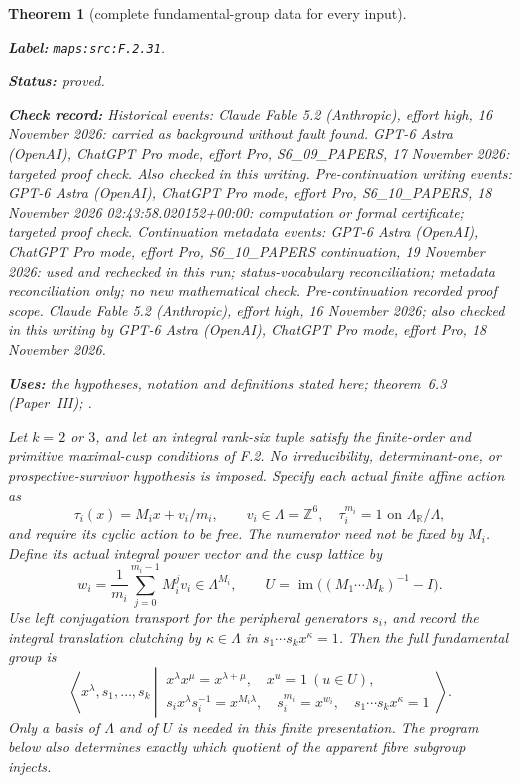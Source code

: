\documentclass[11pt,a4paper]{article}
\newtheorem{theorem}{Theorem}[section]
\theoremstyle{definition}
\newcommand{\StatementRecord}[4]{\par\smallskip\begingroup\upshape\raggedright\noindent\textbf{Label:} \nolinkurl{#1}.\par\noindent\textbf{Status:} #2.\par\noindent\textbf{Check record:} #3.\par\noindent\textbf{Uses:} #4.\par\endgroup\smallskip}
\newcommand{\ExternalPaperRef}[3]{\ifmmode\text{\upshape #1#2 (Paper~#3)}\else #1#2 (Paper~#3)\fi}
\begin{document}
\begin{theorem}[complete fundamental-group data for every input]\label{maps:src:F.2.31}
\StatementRecord{maps:src:F.2.31}{proved}{Historical events: Claude Fable 5.2 (Anthropic), effort high, 16 November 2026: carried as background without fault found. GPT-6 Astra (OpenAI), ChatGPT Pro mode, effort Pro, S6\_09\_PAPERS, 17 November 2026: targeted proof check. Also checked in this writing. Pre-continuation writing events: GPT-6 Astra (OpenAI), ChatGPT Pro mode, effort Pro, S6\_10\_PAPERS, 18 November 2026 02:43:58.020152+00:00: computation or formal certificate; targeted proof check. Continuation metadata events: GPT-6 Astra (OpenAI), ChatGPT Pro mode, effort Pro, S6\_10\_PAPERS continuation, 19 November 2026: used and rechecked in this run; status-vocabulary reconciliation; metadata reconciliation only; no new mathematical check. \emph{Pre-continuation recorded proof scope.} Claude Fable 5.2 (Anthropic), effort high, 16 November 2026; also checked in this writing by GPT-6 Astra (OpenAI), ChatGPT Pro mode, effort Pro, 18 November 2026}{the hypotheses, notation and definitions stated here; \ExternalPaperRef{theorem~}{6.3}{III}; \cite[Theorems 2.3--2.4, p.~425; Euler-characteristic comparison, pp.~427--428]{rootScott83}}


Let $k=2$ or $3$, and let an integral rank-six tuple satisfy the
finite-order and primitive maximal-cusp conditions of F.2.  No
irreducibility, determinant-one, or prospective-survivor hypothesis is
imposed.  Specify each actual finite affine action as
\[
 \tau_i(x)=M_ix+v_i/m_i,\qquad v_i\in\Lambda=\mathbb Z^6,
 \quad \tau_i^{m_i}=1\text{ on }\Lambda_{\mathbb R}/\Lambda,
 \tag{F.G1}\label{maps:eq:F.G1}
\]
and require its cyclic action to be free.  The numerator need not be
fixed by $M_i$.  Define its actual integral power vector and the cusp
lattice by
\[
 w_i=\frac1{m_i}\sum_{j=0}^{m_i-1}M_i^jv_i\in\Lambda^{M_i},
 \qquad U=\operatorname{im}\bigl((M_1\cdots M_k)^{-1}-I\bigr).
 \tag{F.G2}\label{maps:eq:F.G2}
\]
Use left conjugation transport for the peripheral generators $s_i$,
and record the integral translation clutching by $\kappa\in\Lambda$
in $s_1\cdots s_kx^\kappa=1$.  Then the full fundamental group is
\[
 \left\langle x^\lambda,s_1,\ldots,s_k\ \left|\
 \begin{array}{l}
 x^\lambda x^\mu=x^{\lambda+\mu},\quad x^u=1\ (u\in U),\\
 s_ix^\lambda s_i^{-1}=x^{M_i\lambda},\quad
 s_i^{m_i}=x^{w_i},\quad s_1\cdots s_kx^\kappa=1
 \end{array}\right.\right\rangle .                         \tag{F.G3}\label{maps:eq:F.G3}
\]
Only a basis of $\Lambda$ and of $U$ is needed in this finite
presentation.  The program below also determines exactly which
quotient of the apparent fibre subgroup injects.


\end{theorem}
\end{document}
